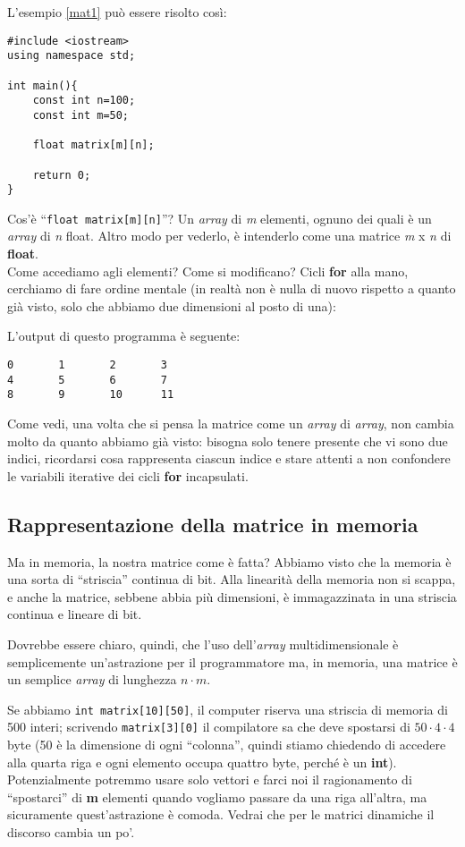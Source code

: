 L'esempio \ref{mat1} può essere risolto così:
\begin{lstlisting}
#include <iostream>
using namespace std;

int main(){
	const int n=100;
	const int m=50;
	
	float matrix[m][n];
	
	return 0;
}
\end{lstlisting}

Cos'è ``\lstinline|float matrix[m][n]|''? Un \emph{array} di \emph{m} elementi, ognuno dei quali è un \emph{array} di \emph{n} float. Altro modo per vederlo, è intenderlo come una matrice \emph{m} x \emph{n} di \textbf{float}.\\

Come accediamo agli elementi? Come si modificano? Cicli \textbf{for} alla mano, cerchiamo di fare ordine mentale (in realtà non è nulla di nuovo rispetto a quanto già visto, solo che abbiamo due dimensioni al posto di una):


L'output di questo programma è seguente:
\begin{shaded}
\begin{verbatim}
0       1       2       3
4       5       6       7
8       9       10      11
\end{verbatim}
\end{shaded}
 Come vedi, una volta che si pensa la matrice come un \emph{array} di \emph{array}, non cambia molto da quanto abbiamo già visto: bisogna solo tenere presente che vi sono due indici, ricordarsi cosa rappresenta ciascun indice e stare attenti a non confondere le variabili iterative dei cicli \textbf{for} incapsulati.
\subsection{Rappresentazione della matrice in memoria}
Ma in memoria, la nostra matrice come è fatta? Abbiamo visto che la memoria è una sorta di ``striscia'' continua di bit. Alla linearità della memoria non si scappa, e anche la matrice, sebbene abbia più dimensioni, è immagazzinata in una striscia continua e lineare di bit. 

Dovrebbe essere chiaro, quindi, che l'uso dell'\emph{array} multidimensionale è semplicemente un'astrazione per il programmatore ma, in memoria, una matrice è un semplice \emph{array} di lunghezza \mbox{$n\cdot m$}. 

Se abbiamo \lstinline|int matrix[10][50]|, il computer riserva una striscia di memoria di 500 interi; scrivendo \lstinline|matrix[3][0]| il compilatore sa che deve spostarsi di $50\cdot4\cdot4$ byte (50 è la dimensione di ogni ``colonna'', quindi stiamo chiedendo di accedere alla quarta riga e ogni elemento occupa quattro byte,  perché è un \textbf{int}). Potenzialmente potremmo usare solo vettori e farci noi il ragionamento di ``spostarci'' di \textbf{m} elementi quando vogliamo passare da una riga all'altra, ma sicuramente quest'astrazione è comoda. Vedrai che per le matrici dinamiche il discorso cambia un po'. 
